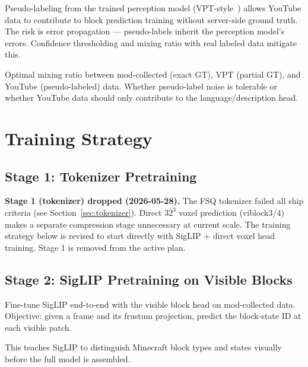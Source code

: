 \documentclass[11pt,a4paper]{article}
\begin{document}
\begin{designdecision}
Pseudo-labeling from the trained perception model (VPT-style~\cite{vpt}) allows YouTube data to contribute to block prediction training without server-side ground truth. The risk is error propagation --- pseudo-labels inherit the perception model's errors. Confidence thresholding and mixing ratio with real labeled data mitigate this.
\end{designdecision}

\begin{openquestion}
Optimal mixing ratio between mod-collected (exact GT), VPT (partial GT), and YouTube (pseudo-labeled) data. Whether pseudo-label noise is tolerable or whether YouTube data should only contribute to the language/description head.
\end{openquestion}

\section{Training Strategy}

\subsection{Stage 1: Tokenizer Pretraining}

\begin{designdecision}
\textbf{Stage 1 (tokenizer) dropped (2026-05-28).} The FSQ tokenizer failed all ship criteria (see Section~\ref{sec:tokenizer}). Direct $32^3$ voxel prediction (viblock3/4) makes a separate compression stage unnecessary at current scale. The training strategy below is revised to start directly with SigLIP + direct voxel head training. Stage 1 is removed from the active plan.
\end{designdecision}

\subsection{Stage 2: SigLIP Pretraining on Visible Blocks}

Fine-tune SigLIP end-to-end with the visible block head on mod-collected data. Objective: given a frame and its frustum projection, predict the block-state ID at each visible patch.

This teaches SigLIP to distinguish Minecraft block types and states visually before the full model is assembled.
\end{document}

